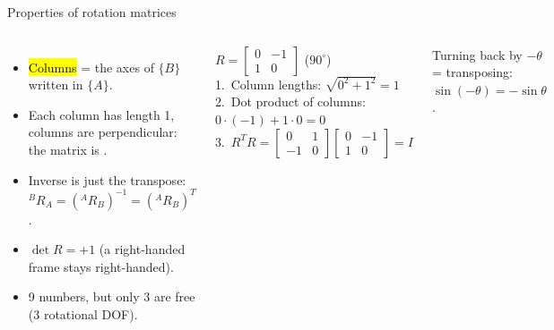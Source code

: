\documentclass[aspectratio=169,10pt]{beamer}
\begin{document}
\begin{frame}[t]{Properties of rotation matrices}
\begin{columns}[T,onlytextwidth]
\begin{itemize}\small
\item \hl{Columns} = the axes of $\{B\}$ written in $\{A\}$.
\item Each column has length 1, columns are perpendicular: the matrix is .
\item Inverse is just the transpose: ${}^B\!R_A=({}^A\!R_B)^{-1}=({}^A\!R_B)^T$.
\item $\det R=+1$ (a right-handed frame stays right-handed).
\item 9 numbers, but only 3 are free (3 rotational DOF).
\end{itemize}
\begin{keybox}
\small $R=\begin{bmatrix}0&-1\\1&0\end{bmatrix}$ ($90^\circ$)\\[1mm]
1.\ Column lengths: $\sqrt{0^2+1^2}=1$ \checkmark\\
2.\ Dot product of columns: $0\cdot(-1)+1\cdot0=0$ \checkmark\\
3.\ $R^TR=\begin{bmatrix}0&1\\-1&0\end{bmatrix}\!\begin{bmatrix}0&-1\\1&0\end{bmatrix}=I$ \checkmark
\end{keybox}
\begin{notebox}
\small Turning back by $-\theta$ = transposing: $\sin(-\theta)=-\sin\theta$.
\end{notebox}
\end{columns}
\end{frame}
\end{document}
